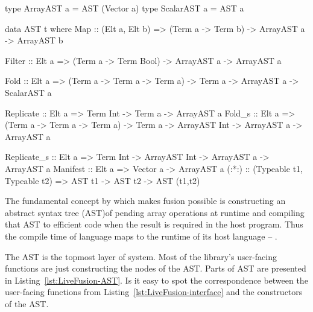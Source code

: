 \documentclass[preamble.tex]{subfiles}
\begin{document}
\begin{hscode2}[%
    caption={\LiveFusion AST (partial).},%
    label=lst:LiveFusion-AST,%
]
type ArrayAST  a = AST (Vector a)
type ScalarAST a = AST a

data AST t where
  Map         :: (Elt a, Elt b)
              => (Term a -> Term b)
              -> ArrayAST a
              -> ArrayAST b

  Filter      :: Elt a
              => (Term a -> Term Bool)
              -> ArrayAST a
              -> ArrayAST a

  Fold        :: Elt a
              => (Term a -> Term a -> Term a)
              -> Term a
              -> ArrayAST a
              -> ScalarAST a

  Replicate   :: Elt a
              => Term Int
              -> Term a
              -> ArrayAST a
  Fold_s      :: Elt a
              => (Term a -> Term a -> Term a)
              -> Term a
              -> ArrayAST Int
              -> ArrayAST a
              -> ArrayAST a

  Replicate_s :: Elt a
              => Term Int
              -> ArrayAST Int
              -> ArrayAST a
              -> ArrayAST a
  Manifest    :: Elt a
              => Vector a
              -> ArrayAST a
  (:*:)       :: (Typeable t1, Typeable t2)
              => AST t1
              -> AST t2
              -> AST (t1,t2)
\end{hscode2}

The fundamental concept by which \LiveFusion makes fusion possible is constructing an abstract syntax tree (AST)\iast of pending array operations at runtime and compiling that AST to efficient code when the result is required in the host program. Thus the compile time of \LiveFusion language maps to the runtime of its host language -- \Haskell.%

The AST is the topmost layer of \LiveFusion system. Most of the library's user-facing functions are just constructing the nodes of the AST. Parts of \LiveFusion AST are presented in Listing~\ref{lst:LiveFusion-AST}. Is it easy to spot the correspondence between the user-facing functions from Listing~\ref{lst:LiveFusion-interface} and the constructors of the AST.
\end{document}
